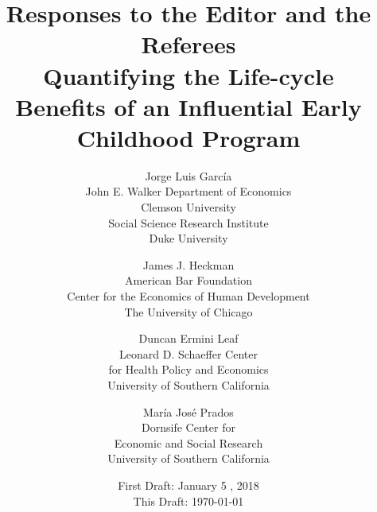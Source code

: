 

\usepackage[stable]{footmisc}

\newcommand*\leftright[2]{%
  \leavevmode
  \rlap{#1}%
  \hspace{0.5\linewidth}%
  #2}

\newcommand{\orth}{\ensuremath{\perp\!\!\!\perp}}%
\newcommand{\indep}{\orth}%
\newcommand{\notorth}{\ensuremath{\perp\!\!\!\!\!\!\diagup\!\!\!\!\!\!\perp}}%
\newcommand{\notindep}{\notorth}

\renewcommand{\theequation}{R.\arabic{equation}}



\doublespacing



\singlespacing
\begin{titlepage}

\title{\Large \textbf{Responses to the Editor and the Referees \bigskip \bigskip  \bigskip \bigskip \\ Quantifying the Life-cycle \\ Benefits of an Influential Early Childhood Program}}

\author{
Jorge Luis Garc\'{i}a\\
John E. Walker  Department of Economics\\
Clemson University \\
Social Science Research Institute \\
Duke University \\  \and
James J. Heckman \\
American Bar Foundation \\
Center for the Economics of Human Development \\
The University of Chicago \and
Duncan Ermini Leaf \\
Leonard D. Schaeffer Center \\  for Health Policy and Economics\\
University of Southern California \and
Mar\'{i}a Jos\'{e} Prados \\
Dornsife Center for \\ Economic and Social Research\\
University of Southern California}
\date{First Draft: January 5 , 2018\\ This Draft: \today}

\maketitle
\thispagestyle{empty}
\end{titlepage}

